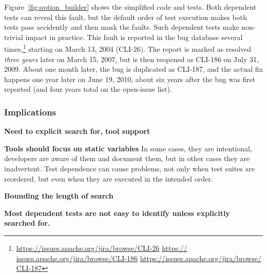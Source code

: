 Figure~\ref{fig:option_builder} shows the simplified code and
tests. Both dependent tests can reveal this fault,  but
the default order of test execution makes both tests pass
accidently and then mask the faults. Such dependent tests
make non-trivial impact in practice.
This fault is reported in the bug
database several times,\footnote{\url{https://issues.apache.org/jira/browse/CLI-26} \url{https://
issues.apache.org/jira/browse/CLI-186} \url{https://issues.apache.org/jira/browse/
CLI-187}} starting on March 13, 2004 (CLI-26). The report is marked as resolved
\emph{three years} later on March 15, 2007, but is then reopened as CLI-186 on
July 31, 2009. About one month later, the bug is duplicated as
CLI-187, and the actual fix happens one 
year later on June 19, 2010, about six years after the bug was first reported (and four years
total on the open-issue list).






\subsubsection{Implications}

\vspace{1mm}
\noindent \textbf{Need to explicit search for, tool support}

\vspace{1mm}
\noindent \textbf{Tools
should focus on static variables}
In some cases, they are intentional, developers are aware
of them and document them, but in other cases they are
inadvertent. Test dependence can cause problems, not only
when test suites are reordered, but even when they are
executed in the intended order.

\vspace{1mm}
\noindent \textbf{Bounding the length
of search}

\vspace{1mm}
\noindent \textbf{Most dependent tests are not easy to identify unless explicitly searched for.}

